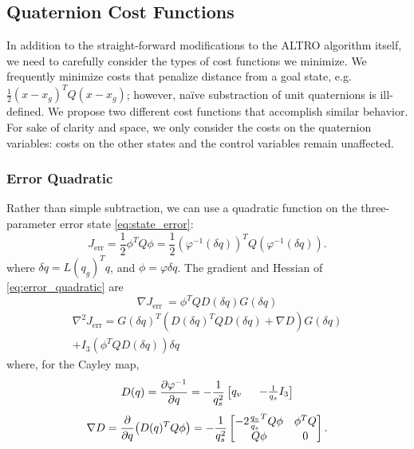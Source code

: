 \documentclass[letterpaper, 10 pt, conference]{ieeeconf}  %
\newcommand{\half}{\frac{1}{2}}
\begin{document}
    \subsection{Quaternion Cost Functions} \label{sec:cost_functions}
        In addition to the straight-forward modifications to the ALTRO algorithm itself, we
        need to carefully consider the types of cost functions we minimize. We frequently
        minimize costs that penalize distance from a goal state, e.g. $\half (x-x_g)^T Q
        (x-x_g)$; however, na\"ive substraction of unit quaternions is ill-defined. We
        propose two different cost functions that accomplish similar behavior.
        For sake of clarity and space, we only consider the costs on the quaternion
        variables: costs on the other states and the control variables remain unaffected.
        
        \subsubsection{Error Quadratic}
            Rather than simple subtraction, we can use a quadratic function on the
            three-parameter error state \eqref{eq:state_error}:
            \begin{equation} \label{eq:error_quadratic}
                J_\text{err} = \half \phi^T Q \phi 
                = \half \left(\varphi^{-1}(\delta q)\right)^T Q 
                        \left(\varphi^{-1}(\delta q)\right).
            \end{equation}
            where $\delta q = L(q_g)^T q$, and $\phi = \varphi{\delta q}$. The gradient
            and Hessian of \eqref{eq:error_quadratic} are
            \begin{equation}
                \nabla J_\text{err }= \phi^T Q  D(\delta q)  G(\delta q)
            \end{equation}
            \begin{multline}
                \nabla^2 J_\text{err} = 
                    G(\delta q)^T \! \left(
                    D(\delta q)^T Q D(\delta q) + \nabla D \right) G(\delta q)  \\
                    + I_3 (\phi^T Q  D(\delta q)) \delta q %
            \end{multline}
            where, for the Cayley map,
            \begin{equation}
                D(q) = \pdv{\varphi^{-1}}{q} = -\frac{1}{q_s^2}\begin{bmatrix}
                    q_v \;\; & -\frac{1}{q_s} I_3
                \end{bmatrix}
            \end{equation}
            \begin{equation}
                \nabla D = \pdv{q}(D(q)^T Q \phi) 
                = -\frac{1}{q_s^2} \begin{bmatrix} 
                    -2 \frac{q_v}{q_s}^T Q \phi & \phi^T Q \\
                                   Q \phi & 0 \\
                \end{bmatrix}.
            \end{equation}
\end{document}
